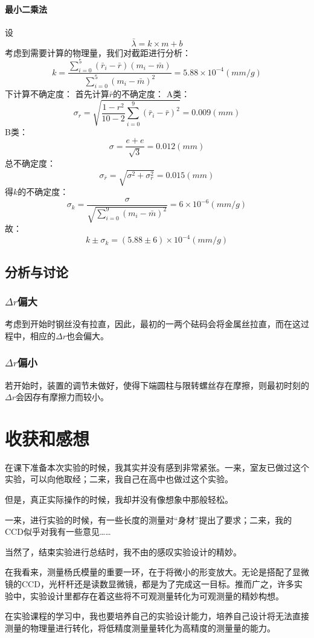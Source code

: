 \documentclass{ctexart}
\begin{document}
\paragraph{最小二乘法}
设$$\bar{\lambda}=k\times m+b$$
考虑到需要计算的物理量，我们对截距进行分析：
$$k=\frac{\sum\limits_{i=0}^5{(\bar{r}_i-\bar{r})(m_i-\bar{m})}}{\sum\limits_{i=0}^5{(m_i-\bar{m})^2}}=5.88\times 10^{-4}(mm/g)$$
下计算不确定度：
首先计算$\bar{r}$的不确定度：
A类：$$\sigma_r =\sqrt{\frac{1-r^2}{10-2}\sum\limits_{i=0}^9{(\bar{r}_i-\bar{r})^2}}=0.009(mm)$$
B类：$$\sigma=\frac{e+e}{\sqrt{3}}=0.012(mm)$$
总不确定度：$$\sigma_{\bar{r}}=\sqrt{\sigma^2+\sigma_r^2}=0.015(mm)$$
得$k$的不确定度：
$$\sigma_k=\frac{\sigma}{\sqrt{\sum\limits_{i=0}^9{(m_i-\bar{m})^2}}}=6\times10^{-6}(mm/g)$$
故：
$$k\pm \sigma_k=(5.88\pm 6  )\times 10^{-4}(mm/g)$$
\subsection{分析与讨论}
\subsubsection{$\Delta r$偏大}考虑到开始时钢丝没有拉直，因此，最初的一两个砝码会将金属丝拉直，而在这过程中，相应的$\Delta r$也会偏大。
\subsubsection{$\Delta r$偏小}若开始时，装置的调节未做好，使得下端圆柱与限转螺丝存在摩擦，则最初时刻的$\Delta r$会因存有摩擦力而较小。
\section{收获和感想}
在课下准备本次实验的时候，我其实并没有感到非常紧张。一来，室友已做过这个实验，可以向他取经；二来，我自己在高中也做过这个实验。

但是，真正实际操作的时候，我却并没有像想象中那般轻松。

一来，进行实验的时候，有一些长度的测量对“身材”提出了要求；二来，我的CCD似乎对我有一些意见……

当然了，结束实验进行总结时，我不由的感叹实验设计的精妙。

在我看来，测量杨氏模量的重要一环，在于将微小的形变放大。无论是搭配了显微镜的CCD，光杆杆还是读数显微镜，都是为了完成这一目标。推而广之，许多实验中，实验设计里都存在着这些将不可观测量转化为可观测量的精妙构想。

在实验课程的学习中，我也要培养自己的实验设计能力，培养自己设计将无法直接测量的物理量进行转化，将低精度测量量转化为高精度的测量量的能力。
    
\end{document}
